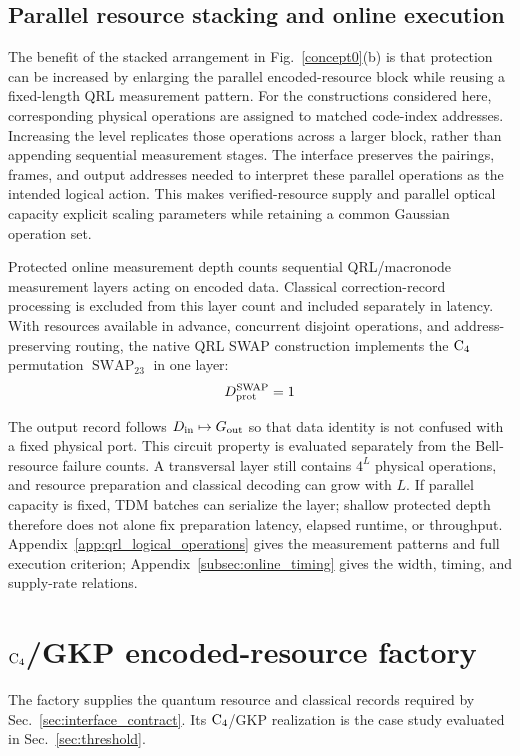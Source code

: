 \documentclass[aps,
prx,
superscriptaddress,
reprint,
longbibliography,
floatfix]{revtex4-2}
\newcounter{criterion}[section]
\begin{document}
\subsection{Parallel resource stacking and online execution}\label{subsec:interface_execution}
The benefit of the stacked arrangement in Fig.~\ref{concept0}(b) is that protection can be increased by enlarging the parallel encoded-resource block while reusing a fixed-length QRL measurement pattern. For the constructions considered here, corresponding physical operations are assigned to matched code-index addresses. Increasing the level replicates those operations across a larger block, rather than appending sequential measurement stages. The interface preserves the pairings, frames, and output addresses needed to interpret these parallel operations as the intended logical action. This makes verified-resource supply and parallel optical capacity explicit scaling parameters while retaining a common Gaussian operation set.

Protected online measurement depth counts sequential QRL/macronode measurement layers acting on encoded data. Classical correction-record processing is excluded from this layer count and included separately in latency. With resources available in advance, concurrent disjoint operations, and address-preserving routing, the native QRL SWAP construction implements the ${\rm C_4}$ permutation $\operatorname{SWAP}_{23}$ in one layer:
\begin{equation}
D_{\rm prot}^{\rm SWAP}=1
\label{eq:swap_depth_benchmark}
\end{equation}

The output record follows $D_{\rm in}\mapsto G_{\rm out}$ so that data identity is not confused with a fixed physical port. This circuit property is evaluated separately from the Bell-resource failure counts. A transversal layer still contains $4^L$ physical operations, and resource preparation and classical decoding can grow with $L$. If parallel capacity is fixed, TDM batches can serialize the layer; shallow protected depth therefore does not alone fix preparation latency, elapsed runtime, or throughput. Appendix~\ref{app:qrl_logical_operations} gives the measurement patterns and full execution criterion; Appendix~\ref{subsec:online_timing} gives the width, timing, and supply-rate relations.

\section{${\rm C_4}$/GKP encoded-resource factory}\label{sec:details}
The factory supplies the quantum resource and classical records required by Sec.~\ref{sec:interface_contract}. Its ${\rm C_4}$/GKP realization is the case study evaluated in Sec.~\ref{sec:threshold}.
\end{document}
